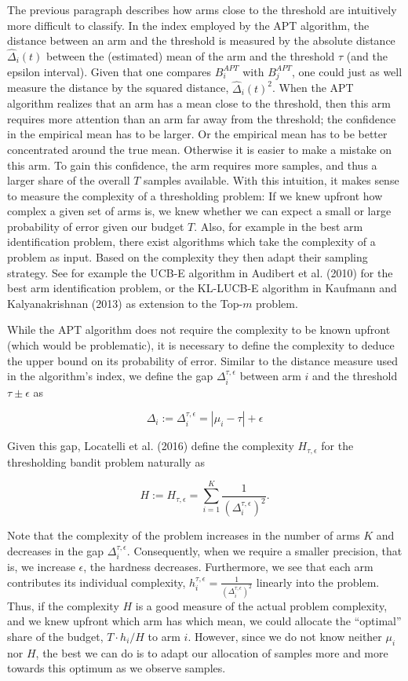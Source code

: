\documentclass[11pt,]{article}
\begin{document}
The previous paragraph describes how arms close to the threshold are
intuitively more difficult to classify. In the index employed by the APT
algorithm, the distance between an arm and the threshold is measured by
the absolute distance \(\hat{\Delta}_i(t)\) between the (estimated) mean
of the arm and the threshold \(\tau\) (and the epsilon interval). Given
that one compares \(B_i^{APT}\) with \(B_j^{APT}\), one could just as
well measure the distance by the squared distance,
\(\hat{\Delta}_i(t)^2\). When the APT algorithm realizes that an arm has
a mean close to the threshold, then this arm requires more attention
than an arm far away from the threshold; the confidence in the empirical
mean has to be larger. Or the empirical mean has to be better
concentrated around the true mean. Otherwise it is easier to make a
mistake on this arm. To gain this confidence, the arm requires more
samples, and thus a larger share of the overall \(T\) samples available.
With this intuition, it makes sense to measure the complexity of a
thresholding problem: If we knew upfront how complex a given set of arms
is, we knew whether we can expect a small or large probability of error
given our budget \(T\). Also, for example in the best arm identification
problem, there exist algorithms which take the complexity of a problem
as input. Based on the complexity they then adapt their sampling
strategy. See for example the UCB-E algorithm in Audibert et al. (2010)
for the best arm identification problem, or the KL-LUCB-E algorithm in
Kaufmann and Kalyanakrishnan (2013) as extension to the Top-\(m\)
problem.

While the APT algorithm does not require the complexity to be known
upfront (which would be problematic), it is necessary to define the
complexity to deduce the upper bound on its probability of error.
Similar to the distance measure used in the algorithm's index, we define
the gap \(\Delta_i^{\tau,\epsilon}\) between arm \(i\) and the threshold
\(\tau \pm \epsilon\) as

\[
\Delta_i := \Delta_i^{\tau,\epsilon} = |\mu_i - \tau| + \epsilon
\]

Given this gap, Locatelli et al. (2016) define the complexity
\(H_{\tau, \epsilon}\) for the thresholding bandit problem naturally as

\[
H := H_{\tau, \epsilon} = \sum_{i=1}^K \frac{1}{(\Delta_i^{\tau,\epsilon})^2}.
\]

Note that the complexity of the problem increases in the number of arms
\(K\) and decreases in the gap \(\Delta_i^{\tau,\epsilon}\).
Consequently, when we require a smaller precision, that is, we increase
\(\epsilon\), the hardness decreases. Furthermore, we see that each arm
contributes its individual complexity,
\(h_i^{\tau,\epsilon} = \frac{1}{(\Delta_i^{\tau,\epsilon})^2}\)
linearly into the problem. Thus, if the complexity \(H\) is a good
measure of the actual problem complexity, and we knew upfront which arm
has which mean, we could allocate the ``optimal'' share of the budget,
\(T \cdot h_i /H\) to arm \(i\). However, since we do not know neither
\(\mu_i\) nor \(H\), the best we can do is to adapt our allocation of
samples more and more towards this optimum as we observe samples.
\end{document}
